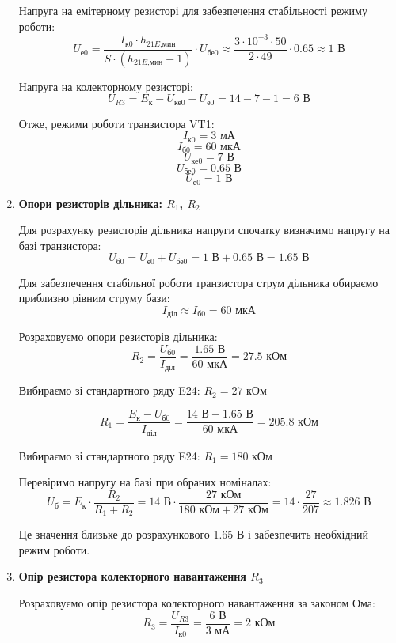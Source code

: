 \documentclass[main.tex]{subfiles}
\begin{document}
\begin{enumerate}
Напруга на емітерному резисторі для забезпечення стабільності режиму роботи:
\[U_{\text{е0}} = \frac{I_{\text{к0}} \cdot h_{21E\text{,мин}}}{S \cdot (h_{21E\text{,мин}} - 1)} \cdot U_{\text{бе0}} \approx \frac{3 \cdot 10^{-3} \cdot 50}{2 \cdot 49} \cdot 0.65 \approx 1\text{ В}\]

Напруга на колекторному резисторі:
\[U_{R3} = E_{\text{к}} - U_{\text{ке0}} - U_{\text{е0}} = 14 - 7 - 1 = 6\text{ В}\]

Отже, режими роботи транзистора VT1:
\[I_{\text{к0}} = 3\text{ мА}\]
\[I_{\text{б0}} = 60\text{ мкА}\]
\[U_{\text{ке0}} = 7\text{ В}\]
\[U_{\text{бе0}} = 0.65\text{ В}\]
\[U_{\text{е0}} = 1\text{ В}\]

\item \textbf{Опори резисторів дільника: $R_1$, $R_2$} \newline

Для розрахунку резисторів дільника напруги спочатку визначимо напругу на базі транзистора:
\[U_{\text{б0}} = U_{\text{е0}} + U_{\text{бе0}} = 1\text{ В} + 0.65\text{ В} = 1.65\text{ В}\]

Для забезпечення стабільної роботи транзистора струм дільника обираємо приблизно рівним струму бази:
\[I_{\text{діл}} \approx I_{\text{б0}} = 60\text{ мкА}\]

Розраховуємо опори резисторів дільника:
\[R_2 = \frac{U_{\text{б0}}}{I_{\text{діл}}} = \frac{1.65\text{ В}}{60\text{ мкА}} = 27.5\text{ кОм}\]

Вибираємо зі стандартного ряду E24: $R_2 = 27\text{ кОм}$

\[R_1 = \frac{E_{\text{к}} - U_{\text{б0}}}{I_{\text{діл}}} = \frac{14\text{ В} - 1.65\text{ В}}{60\text{ мкА}} = 205.8\text{ кОм}\]

Вибираємо зі стандартного ряду E24: $R_1 = 180\text{ кОм}$

Перевіримо напругу на базі при обраних номіналах:
\[U_{\text{б}} = E_{\text{к}} \cdot \frac{R_2}{R_1 + R_2} = 14\text{ В} \cdot \frac{27\text{ кОм}}{180\text{ кОм} + 27\text{ кОм}} = 14 \cdot \frac{27}{207} \approx 1.826\text{ В}\]

Це значення близьке до розрахункового 1.65 В і забезпечить необхідний режим роботи.

\item \textbf{Опір резистора колекторного навантаження $R_3$} \newline

Розраховуємо опір резистора колекторного навантаження за законом Ома:
\[
R_3 = \frac{U_{R3}}{I_{\text{к0}}} = \frac{6\text{ В}}{3\text{ мА}} = 2\text{ кОм}
\]


\end{enumerate}
\end{document}
